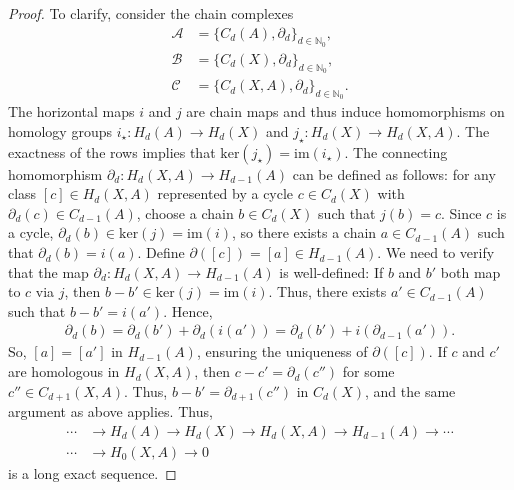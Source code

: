 \begin{proof}
	To clarify, consider the chain complexes
	\begin{align}
		\label{chaincomplexeseq}
		\mathcal{A} & = \{C_{d}(A), \partial_{d}\}_{d \in \mathbb{N}_0}, \nonumber\\
		\mathcal{B} & = \{C_{d}(X), \partial_{d}\}_{d \in \mathbb{N}_0}, \nonumber\\
		\mathcal{C} & = \{C_{d}(X, A), \partial_{d}\}_{d \in \mathbb{N}_0}. 
	\end{align}
	The horizontal maps \(i\) and \(j\) are chain maps and thus induce homomorphisms on homology groups \(i_{\star}: H_{d}(A) \rightarrow H_{d}(X)\) and \(j_{\star}: H_{d}(X) \rightarrow H_{d}(X, A)\). The exactness of the rows implies that \(\mathrm{ker}(j_{\star}) = \mathrm{im}(i_{\star})\). The connecting homomorphism \(\partial_d: H_{d}(X, A) \rightarrow H_{d-1}(A)\) can be defined as follows: for any class \([c] \in H_{d}(X, A)\) represented by a cycle \(c \in C_{d}(X)\) with \(\partial_{d}(c) \in C_{d-1}(A)\), choose a chain \(b \in C_{d}(X)\) such that \(j(b) = c\). Since \(c\) is a cycle, \(\partial_{d}(b) \in \mathrm{ker}(j) = \mathrm{im}(i)\), so there exists a chain \(a \in C_{d-1}(A)\) such that \(\partial_{d}(b) = i(a)\). Define \(\partial([c]) = [a] \in H_{d-1}(A)\). We need to verify that the map \(\partial_d: H_{d}(X, A) \rightarrow H_{d-1}(A)\) is well-defined: If \(b\) and \(b'\) both map to \(c\) via \(j\), then \(b - b' \in \mathrm{ker}(j) = \mathrm{im}(i)\). Thus, there exists \(a' \in C_{d-1}(A)\) such that \(b - b' = i(a')\). Hence,
	\begin{align}
		\partial_{d}(b) = \partial_{d}(b') + \partial_{d}(i(a')) = \partial_{d}(b') + i(\partial_{d-1}(a')). 
	\end{align}
	So, \([a] = [a']\) in \(H_{d-1}(A)\), ensuring the uniqueness of \(\partial([c])\). If \(c\) and \(c'\) are homologous in \(H_{d}(X, A)\), then \(c - c' = \partial_{d}(c'')\) for some \(c'' \in C_{d+1}(X, A)\). Thus, \(b - b' = \partial_{d+1}(c'')\) in \(C_{d}(X)\), and the same argument as above applies. Thus,
	\begin{align}
		\cdots &\rightarrow H_{d}(A) \rightarrow H_{d}(X) \rightarrow H_{d}(X, A) \rightarrow H_{d-1}(A) \rightarrow \cdots \nonumber\\
		\cdots &\rightarrow H_{0}(X, A) \rightarrow 0                                                                    
	\end{align}
	is a long exact sequence.
\end{proof}

